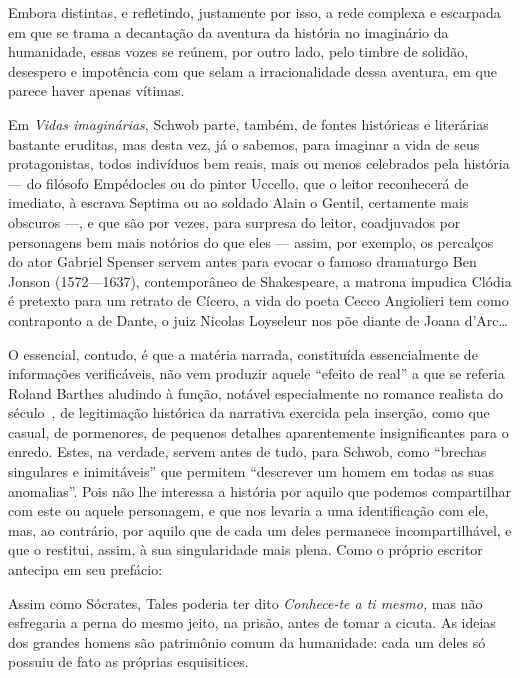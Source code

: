Embora distintas, e refletindo, justamente por isso, a rede complexa e escarpada
em que se trama a decantação da aventura da história no imaginário da
humanidade, essas vozes se reúnem, por outro lado, pelo timbre de solidão,
desespero e impotência com que selam a irracionalidade dessa aventura, em que
parece haver apenas vítimas.

Em \textit{Vidas imaginárias}, Schwob parte, também, de fontes históricas e
literárias bastante eruditas, mas desta vez, já o sabemos, para imaginar a vida
de seus protagonistas, todos indivíduos bem reais, mais ou menos celebrados
pela história --- do filósofo Empédocles ou do pintor Uccello, que o leitor
reconhecerá de imediato, à escrava Septima ou ao soldado Alain o Gentil,
certamente mais obscuros ---, e que são por vezes, para surpresa do leitor,
coadjuvados por  personagens bem mais notórios do que eles --- assim, por
exemplo, os percalços do ator Gabriel Spenser servem antes para evocar o famoso
dramaturgo Ben Jonson (1572---1637), contemporâneo de Shakespeare, a matrona impudica Clódia
é pretexto para um retrato de Cícero, a vida do poeta Cecco Angiolieri tem como
contraponto a de Dante, o juiz Nicolas Loyseleur nos põe diante de Joana d’Arc\ldots{} 

O essencial, contudo, é que a matéria narrada, constituída essencialmente de
informações verificáveis, não vem produzir aquele “efeito de real” a que se
referia Roland Barthes aludindo à função, notável especialmente no romance
realista do século~, de legitimação histórica da narrativa exercida pela
inserção, como que casual, de pormenores, de pequenos detalhes aparentemente
insignificantes para o enredo. Estes, na verdade, servem antes de tudo, para
Schwob, como “brechas singulares e inimitáveis” que permitem “descrever um
homem em todas as suas anomalias”. Pois não lhe interessa a história por
aquilo que podemos compartilhar com este ou aquele personagem, e que nos
levaria a uma identificação com ele, mas, ao contrário, por aquilo que de cada
um deles permanece incompartilhável, e que o restitui, assim, à sua
singularidade mais plena. Como o próprio escritor antecipa em seu prefácio:

\begin{hedraquote}
Assim como Sócrates, Tales poderia ter dito \textit{Conhece-te a ti mesmo,
}mas não esfregaria a perna do mesmo jeito, na prisão, antes de tomar a cicuta.
As ideias dos grandes homens são patrimônio comum da humanidade: cada um deles
só possuiu de fato as próprias esquisitices.
\end{hedraquote}

